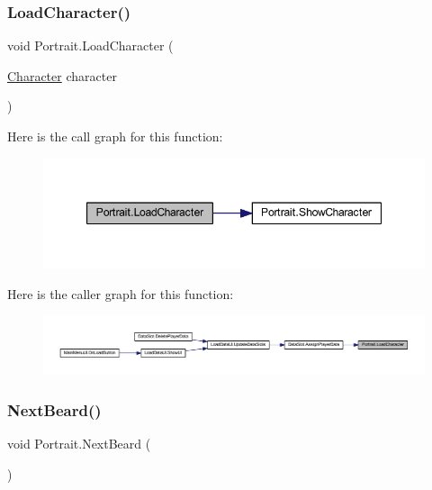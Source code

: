 \subsubsection{\texorpdfstring{LoadCharacter()}{LoadCharacter()}}
{\footnotesize\ttfamily void Portrait.\+Load\+Character (\begin{DoxyParamCaption}\item[{\mbox{\hyperlink{class_character}{Character}}}]{character }\end{DoxyParamCaption})}

Here is the call graph for this function\+:
\nopagebreak
\begin{figure}[H]
\begin{center}
\leavevmode
\includegraphics[width=347pt]{class_portrait_a003483e7707bbb34e09ef3736e5b5b41_cgraph}
\end{center}
\end{figure}
Here is the caller graph for this function\+:
\nopagebreak
\begin{figure}[H]
\begin{center}
\leavevmode
\includegraphics[width=350pt]{class_portrait_a003483e7707bbb34e09ef3736e5b5b41_icgraph}
\end{center}
\end{figure}
\mbox{\label{class_portrait_a357f23630fd1689f2de8ef7a114c151e}} 
\subsubsection{\texorpdfstring{NextBeard()}{NextBeard()}}
{\footnotesize\ttfamily void Portrait.\+Next\+Beard (\begin{DoxyParamCaption}{ }\end{DoxyParamCaption})}

